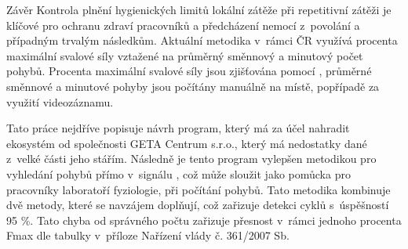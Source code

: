 \chap Závěr
    Kontrola plnění hygienických limitů lokální zátěže při repetitivní zátěži je klíčové pro ochranu zdraví pracovníků a předcházení nemocí z~povolání a případným trvalým následkům. Aktuální metodika v~rámci ČR využívá procenta maximální svalové síly vztažené na průměrný směnnový a minutový počet pohybů. Procenta maximální svalové síly jsou zjišťována pomocí , průměrné směnnové a minutové pohyby jsou počítány manuálně na místě, popřípadě za využití videozáznamu.

    Tato práce nejdříve popisuje návrh program, který má za účel nahradit ekosystém od společnosti GETA Centrum s.r.o., který má nedostatky dané z~velké části jeho stářím. Následně je tento program vylepšen metodikou pro vyhledání pohybů přímo v~signálu , což může sloužit jako pomůcka pro pracovníky laboratoří fyziologie, při počítání pohybů. Tato metodika kombinuje dvě metody, které se navzájem doplňují, což zařizuje detekci cyklů s~úspěšností 95 \%. Tato chyba od správného počtu zařizuje přesnost v~rámci jednoho procenta Fmax dle tabulky v~příloze Nařízení vlády č. 361/2007 Sb.
